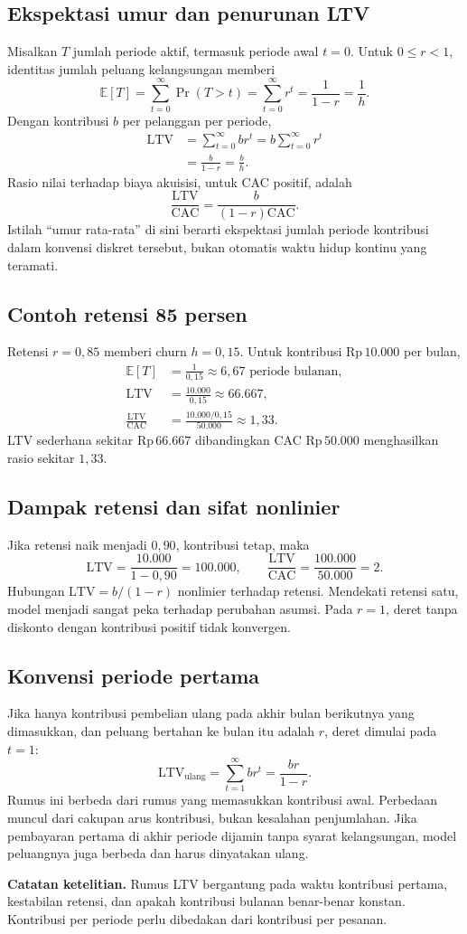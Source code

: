 \documentclass[11pt,a4paper]{article}
\newcommand{\bagian}[1]{\Needspace{5\baselineskip}\subsection{#1}}
\newcommand{\catatan}[1]{\par\textbf{Catatan ketelitian.} #1\par}
\newcommand{\CAC}{\mathrm{CAC}}
\newcommand{\LTV}{\mathrm{LTV}}
\newcommand{\rp}[1]{\ensuremath{\mathrm{Rp}\,#1}}
\begin{document}
\bagian{Ekspektasi umur dan penurunan LTV}
Misalkan \(T\) jumlah periode aktif, termasuk periode awal \(t=0\). Untuk \(0\le r<1\), identitas jumlah peluang kelangsungan memberi
\[
\mathbb{E}[T]=\sum_{t=0}^{\infty}\Pr(T>t)
=\sum_{t=0}^{\infty}r^t=\frac{1}{1-r}=\frac{1}{h}.
\]
Dengan kontribusi \(b\) per pelanggan per periode,
\[
\begin{aligned}
\LTV&=\sum_{t=0}^{\infty}br^t
=b\sum_{t=0}^{\infty}r^t\\
&=\frac{b}{1-r}=\frac{b}{h}.
\end{aligned}
\]
Rasio nilai terhadap biaya akuisisi, untuk CAC positif, adalah
\[
\frac{\LTV}{\CAC}=\frac{b}{(1-r)\CAC}.
\]
Istilah ``umur rata-rata'' di sini berarti ekspektasi jumlah periode kontribusi dalam konvensi diskret tersebut, bukan otomatis waktu hidup kontinu yang teramati.

\bagian{Contoh retensi 85 persen}
Retensi \(r=0{,}85\) memberi churn \(h=0{,}15\). Untuk kontribusi \rp{10.000} per bulan,
\[
\begin{aligned}
\mathbb{E}[T]&=\frac{1}{0{,}15}\approx6{,}67\text{ periode bulanan},\\
\LTV&=\frac{10.000}{0{,}15}\approx66.667,\\
\frac{\LTV}{\CAC}&=\frac{10.000/0{,}15}{50.000}\approx1{,}33.
\end{aligned}
\]
LTV sederhana sekitar \rp{66.667} dibandingkan CAC \rp{50.000} menghasilkan rasio sekitar \(1{,}33\).

\bagian{Dampak retensi dan sifat nonlinier}
Jika retensi naik menjadi \(0{,}90\), kontribusi tetap, maka
\[
\LTV=\frac{10.000}{1-0{,}90}=100.000,\qquad
\frac{\LTV}{\CAC}=\frac{100.000}{50.000}=2.
\]
Hubungan \(\LTV=b/(1-r)\) nonlinier terhadap retensi. Mendekati retensi satu, model menjadi sangat peka terhadap perubahan asumsi. Pada \(r=1\), deret tanpa diskonto dengan kontribusi positif tidak konvergen.

\bagian{Konvensi periode pertama}
Jika hanya kontribusi pembelian ulang pada akhir bulan berikutnya yang dimasukkan, dan peluang bertahan ke bulan itu adalah \(r\), deret dimulai pada \(t=1\):
\[
\LTV_{\text{ulang}}=\sum_{t=1}^{\infty}br^t
=\frac{br}{1-r}.
\]
Rumus ini berbeda dari rumus yang memasukkan kontribusi awal. Perbedaan muncul dari cakupan arus kontribusi, bukan kesalahan penjumlahan. Jika pembayaran pertama di akhir periode dijamin tanpa syarat kelangsungan, model peluangnya juga berbeda dan harus dinyatakan ulang.
\catatan{Rumus LTV bergantung pada waktu kontribusi pertama, kestabilan retensi, dan apakah kontribusi bulanan benar-benar konstan. Kontribusi per periode perlu dibedakan dari kontribusi per pesanan.}
\end{document}
